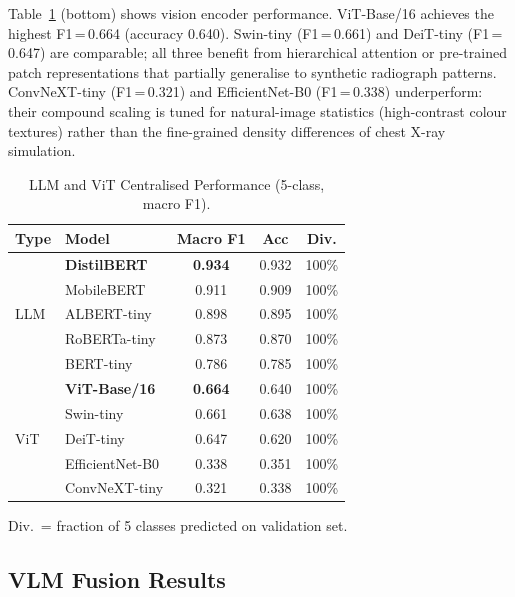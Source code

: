 \documentclass[conference]{IEEEtran}
\begin{document}
Table~\ref{tab:unimodal} (bottom) shows vision encoder performance.
ViT-Base/16 achieves the highest F1\,=\,0.664 (accuracy 0.640).
Swin-tiny (F1\,=\,0.661) and DeiT-tiny (F1\,=\,0.647) are comparable;
all three benefit from hierarchical attention or pre-trained patch
representations that partially generalise to synthetic radiograph
patterns. ConvNeXT-tiny (F1\,=\,0.321) and EfficientNet-B0 (F1\,=\,0.338)
underperform: their compound scaling is tuned for natural-image statistics
(high-contrast colour textures) rather than the fine-grained density
differences of chest X-ray simulation.

\begin{table}[t]
\caption{LLM and ViT Centralised Performance (5-class, macro F1).}
\label{tab:unimodal}
\centering\footnotesize
\setlength\tabcolsep{4pt}
\begin{tabular}{llccc}
\toprule
\textbf{Type} & \textbf{Model} & \textbf{Macro F1} & \textbf{Acc} & \textbf{Div.}\\
\midrule
\multirow{5}{*}{LLM}
  & \cellcolor{llmblue!28}\textbf{DistilBERT}
                   & \cellcolor{llmblue!28}\textbf{0.934} & \cellcolor{llmblue!28}0.932 & \cellcolor{llmblue!28}100\% \\
  & MobileBERT    & 0.911 & 0.909 & 100\% \\
  & ALBERT-tiny   & 0.898 & 0.895 & 100\% \\
  & RoBERTa-tiny  & 0.873 & 0.870 & 100\% \\
  & BERT-tiny     & 0.786 & 0.785 & 100\% \\
\midrule
\multirow{5}{*}{ViT}
  & \cellcolor{vitgreen!28}\textbf{ViT-Base/16}
                   & \cellcolor{vitgreen!28}\textbf{0.664} & \cellcolor{vitgreen!28}0.640 & \cellcolor{vitgreen!28}100\% \\
  & Swin-tiny     & 0.661 & 0.638 & 100\% \\
  & DeiT-tiny     & 0.647 & 0.620 & 100\% \\
  & EfficientNet-B0 & 0.338 & 0.351 & 100\% \\
  & ConvNeXT-tiny & 0.321 & 0.338 & 100\% \\
\bottomrule
\end{tabular}
\vspace{1pt}
{\scriptsize Div.\ = fraction of 5 classes predicted on validation set.}
\end{table}

\subsection{VLM Fusion Results}
\end{document}
